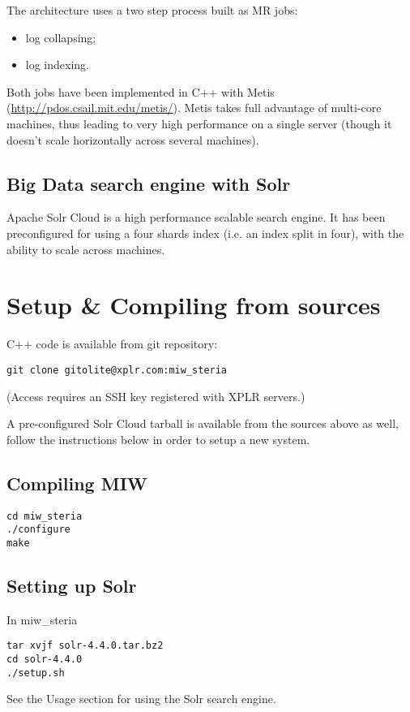 \documentclass[twoside,11pt]{article}
\begin{document}
The architecture uses a two step process built as MR jobs:
\begin{itemize}
\item log collapsing;
\item log indexing.
\end{itemize}

Both jobs have been implemented in C++ with Metis (\url{http://pdos.csail.mit.edu/metis/}). Metis takes full advantage of multi-core machines, thus leading to very high performance on a single server (though it doesn't scale horizontally across several machines).

%

\subsection{Big Data search engine with Solr}

Apache Solr Cloud is a high performance scalable search engine. It has been preconfigured for using a four shards index (i.e. an index split in four), with the ability to scale across machines.

\section{Setup \& Compiling from sources}

C++ code is available from git repository:
\begin{verbatim}
git clone gitolite@xplr.com:miw_steria
\end{verbatim}
(Access requires an SSH key registered with XPLR servers.)

A pre-configured Solr Cloud tarball is available from the sources above as well, follow the instructions below in order to setup a new system.

\subsection{Compiling MIW}
\begin{verbatim}
cd miw_steria
./configure
make
\end{verbatim}

\subsection{Setting up Solr}
In miw\_steria
\begin{verbatim}
tar xvjf solr-4.4.0.tar.bz2
cd solr-4.4.0
./setup.sh
\end{verbatim}
See the Usage section for using the Solr search engine.
\end{document}
